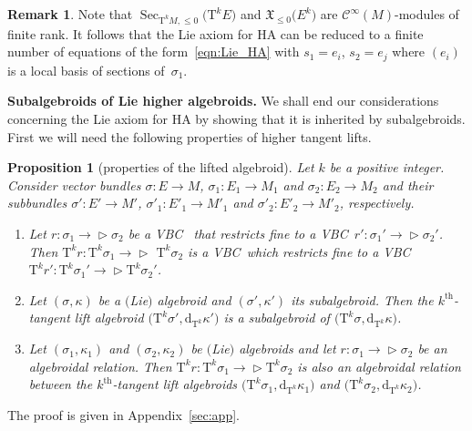 \documentclass[10pt,a4paper]{amsart}
\newcommand{\ZM}{{VBC}} %
\newcommand{\thh}[1]{#1^{\mathrm{th}}} %
\newcommand{\Sec}{\operatorname{Sec}}
\newcommand{\dd}{\mathrm{d}}
\newcommand{\X}{\mathfrak{X}}
\newcommand{\ra}{\rightarrow}
\newcommand{\TT}[1]{\mathrm{T}^{#1}} %
\newcommand{\Cf}{\mathcal{C}^\infty}
\def\relto{\rightarrow\!\!\vartriangleright} %
\numberwithin{equation}{section}
\newtheorem{prop}[thm]{Proposition}
\theoremstyle{definition}
\newtheorem{rem}[thm]{Remark}
\begin{document}
\begin{rem} Note that $\Sec_{\TT{k} M, \leq0}\big(\TT{k} E\big)$ and $\X_{\leq0}\big(E^k\big)$ are $\Cf(M)$-modules of finite rank. It follows that the Lie axiom for HA can be reduced to a finite number of equations of the form~\eqref{eqn:Lie_HA} with $s_1=e_i$, $s_2=e_j$ where $(e_i)$ is a local basis of sections of~$\sigma_1$.
\end{rem}

{\bf Subalgebroids of Lie higher algebroids.} We shall end our considerations concerning the Lie axiom for HA by showing that it is inherited by subalgebroids. First we will need the following properties of higher tangent lifts.
\begin{prop}[properties of the lifted algebroid] \label{prop:sub_algebroidal_rel} Let $k$ be a positive integer. Consider vector bundles $\sigma\colon E\ra M$, $\sigma_1\colon E_1\ra M_1$ and $\sigma_2\colon E_2\ra M_2$ and their subbundles $\sigma'\colon E'\ra M'$, $\sigma'_1\colon E'_1\ra M'_1$ and $\sigma'_2\colon E'_2\ra M'_2$, respectively.
\begin{enumerate}[$(i)$]\itemsep=0pt
 \item \label{item:T^kr restricts_fine} Let
 $r\colon \sigma_1\relto \sigma_2$ be a \ZM
	\ that restricts fine to a \ZM\ $r'\colon \sigma_1'\relto \sigma_2'$. Then $\TT{k} r\colon \TT{k}\sigma_1\mbox{$\relto$}$ $\TT{k}\sigma_2$ is a \ZM\ which restricts fine to a \ZM\ $\TT{k} r'\colon \TT{k} \sigma_1'\relto\TT{k} \sigma_2'$.
 \item \label{item:T^kE_as_subalgeroid} Let $(\sigma,\kappa)$ be a $($Lie$)$ algebroid and $(\sigma',\kappa')$ its subalgebroid. Then the $\thh{k}$-tangent lift algebroid $\big(\TT{k}\sigma',\dd_{\TT{k}}\kappa'\big)$ is a subalgebroid of $\big(\TT{k}\sigma,\dd_{\TT{k}}\kappa\big)$.
 \item \label{item:T^kr_also_algebroidal} Let $(\sigma_1, \kappa_1)$ and $(\sigma_2,\kappa_2)$ be $($Lie$)$ algebroids and let $r\colon \sigma_1\relto \sigma_2$ be an algebroidal relation. Then $\TT{k} r\colon \TT{k} \sigma_1\relto \TT{k} \sigma_2$ is also an algebroidal relation between the $\thh{k}$-tangent lift algebroids $\big(\TT{k}\sigma_1,\dd_{\TT{k}}\kappa_1\big)$ and $\big(\TT{k}\sigma_2,\dd_{\TT{k}}\kappa_2\big)$.
\end{enumerate}
\end{prop}
The proof is given in Appendix~\ref{sec:app}.
\end{document}

